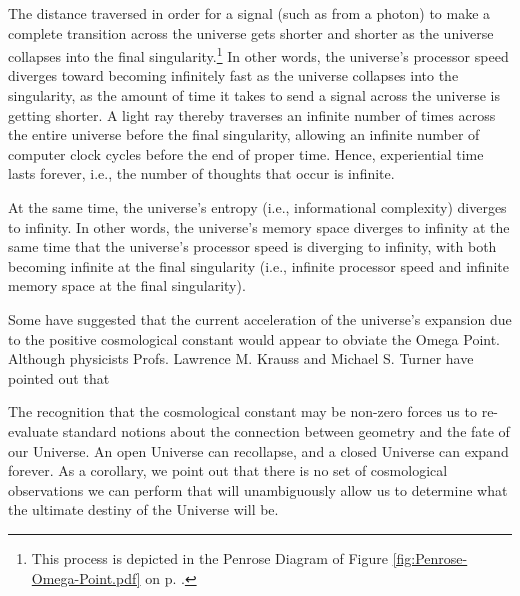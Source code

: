 \documentclass[letterpaper,12pt]{article}
\newcounter{UniverseAccelerationZ}
\newenvironment{squote}
  {\small\quote}
  {\endquote\normalsize}
\begin{document}
The distance traversed in order for a signal (such as from a photon) to make a complete transition across the universe gets shorter and shorter as the universe collapses into the final singularity.\footnote{This process is depicted in the Penrose Diagram of Figure \ref{fig:Penrose-Omega-Point.pdf} on p. \pageref{fig:Penrose-Omega-Point.pdf}.} In other words, the universe's processor speed diverges toward becoming infinitely fast as the universe collapses into the singularity, as the amount of time it takes to send a signal across the universe is getting shorter. A light ray thereby traverses an infinite number of times across the entire universe before the final singularity, allowing an infinite number of computer clock cycles before the end of proper time. Hence, experiential time lasts forever, i.e., the number of thoughts that occur is infinite.

At the same time, the universe's entropy (i.e., informational complexity) diverges to infinity. In other words, the universe's memory space diverges to infinity at the same time that the universe's processor speed is diverging to infinity, with both becoming infinite at the final singularity (i.e., infinite processor speed and infinite memory space at the final singularity).

Some\label{UniverseAcceleration} have suggested that the current acceleration of the universe's expansion due to the positive cosmological constant would appear to obviate the Omega Point. Although physicists Profs. Lawrence M. Krauss and Michael S. Turner have pointed out \cite{Krauss1999} that

\begin{squote}
The recognition that the cosmological constant may be non-zero forces us to re-evaluate standard notions about the connection between geometry and the fate of our Universe. An open Universe can recollapse, and a closed Universe can expand forever. As a corollary, we point out that there is no set of cosmological observations we can perform that will unambiguously allow us to determine what the ultimate destiny of the Universe will be.
\end{squote}
\end{document}
